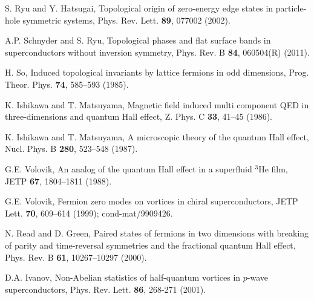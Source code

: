 \documentclass[prb,
superscriptaddress,showpacs,amsmath,amssymb]{revtex4}
\begin{document}
\begin{thebibliography}{99}
S. Ryu and  Y. Hatsugai, 
Topological origin of zero-energy edge states in particle-hole symmetric systems,
 Phys. Rev. Lett. {\bf 89}, 077002 (2002).

 A.P.  Schnyder and S. Ryu, 
Topological phases and flat surface bands in superconductors without inversion symmetry,
Phys. Rev. B {\bf 84}, 060504(R) (2011).

H. So,
Induced topological invariants by lattice fermions in odd dimensions,
Prog. Theor. Phys. {\bf 74}, 585--593 (1985).

K. Ishikawa  and T. Matsuyama,
Magnetic field induced multi component QED in three-dimensions and quantum Hall effect,
Z. Phys. C {\bf 33}, 41--45 (1986). 

K. Ishikawa and T. Matsuyama,
A microscopic theory of the quantum Hall effect, 
Nucl. Phys. B  {\bf 280}, 523--548  (1987).

 G.E. Volovik, 
 An analog of the quantum Hall effect in a superfluid $^3$He film,
JETP  {\bf 67}, 1804--1811 (1988).

G.E. Volovik,  
Fermion zero modes on vortices in  chiral superconductors,  
JETP Lett. {\bf 70}, 609--614 (1999); cond-mat/9909426.

N. Read and D. Green,
Paired states of fermions in two dimensions with breaking of parity and time-reversal symmetries and the fractional quantum Hall effect,
Phys. Rev. B {\bf 61}, 10267--10297 (2000).

D.A. Ivanov,
Non-Abelian statistics of half-quantum vortices in $p$-wave superconductors,
Phys. Rev. Lett. {\bf 86}, 268-271 (2001).





\end{thebibliography}
 
\end{document}
